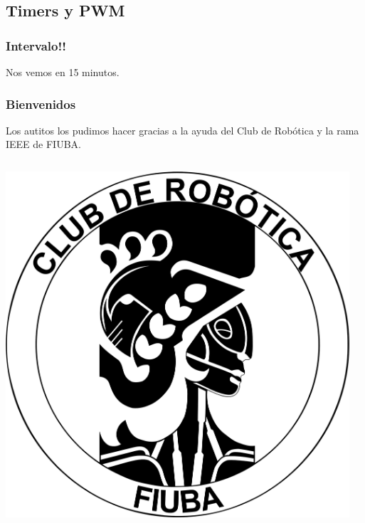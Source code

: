 \documentclass[compress]{beamer}
\begin{document}
\subsection{Timers y PWM}

\begin{frame}
 \frametitle{Intervalo!!}
\vspace{2cm}
\begin{center}
\Huge{Nos vemos en 15 minutos.}
\end{center}
\vspace{2cm}
\end{frame}

\begin{frame}
 \frametitle{Bienvenidos}

Los autitos los pudimos hacer gracias a la ayuda del Club de Robótica y la rama IEEE de FIUBA.
\begin{columns}
\begin{center}
 \includegraphics[width=\columnwidth]{./img/cdrfiuba.png}
\end{center}
\begin{center}
\end{center}
\end{columns}

\end{frame}
\end{document}
